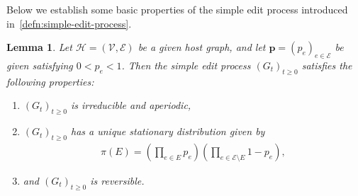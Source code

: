 \documentclass[11pt,a4paper]{article}
\newtheorem{lemma}[theorem]{Lemma}
\begin{document}

Below we establish some basic properties of the simple edit process introduced in~\cref{defn:simple-edit-process}.

\begin{lemma}\label{lem:ergodicity-of-gemc}
    Let $\mathcal{H}=(\mathcal{V},\mathcal{E})$ be a given host graph, and let $\mathbf{p} = (p_e)_{e\in\mathcal{E}}$ be given satisfying $0<p_e<1$. Then the simple edit process $(G_t)_{t\geq 0}$ satisfies the following properties:
        \begin{enumerate}[label=\textit{(\roman*)}]
            \item $(G_t)_{t\geq 0}$ is irreducible and aperiodic,
            \item $(G_t)_{t\geq 0}$ has a unique stationary distribution given by 
                \begin{align}\label{eq:formula-for-gemc-stationary}
                    \pi(E) = \left(\prod_{e\in E} p_e\right) \left(\prod_{e\in\mathcal{E}\setminus E} 1-p_e\right),
                \end{align}	
            \item and $(G_t)_{t\geq 0}$ is reversible.
        \end{enumerate}
\end{lemma}
\end{document}
